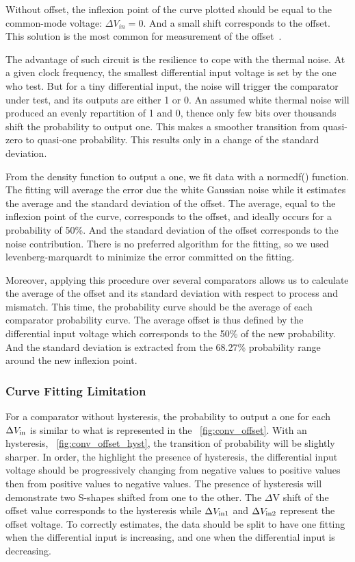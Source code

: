 Without offset, the inflexion point of the curve plotted should be equal to the common-mode voltage: $\Delta V_{in} = 0$. And a small shift corresponds to the offset. This solution is the most common for measurement of the offset~\cite{4395036,6482245,6644886}.

The advantage of such circuit is the resilience to cope with the thermal noise. At a given clock frequency, the smallest differential input voltage is set by the one who test. But for a tiny differential input, the noise will trigger the comparator under test, and its outputs are either 1 or 0. An assumed white thermal noise will produced an evenly repartition of 1 and 0, thence only few bits over thousands shift the probability to output one. This makes a smoother transition from quasi-zero to quasi-one probability. This results only in a change of the standard deviation.

From the density function to output a one, we fit data with a normcdf() function. The fitting will average the error due the white Gaussian noise while it estimates the average and the standard deviation of the offset. The average, equal to the inflexion point of the curve, corresponds to the offset, and ideally occurs for a probability of 50\%. And the standard deviation of the offset corresponds to the noise contribution. There is no preferred algorithm for the fitting, so we used levenberg-marquardt to minimize the error committed on the fitting.

Moreover, applying this procedure over several comparators allows us to calculate the average of the offset and its standard deviation with respect to process and mismatch. This time, the probability curve should be the average of each comparator probability curve. The average offset is thus defined by the differential input voltage which corresponds to the 50\% of the new probability. And the standard deviation is extracted from the 68.27\% probability range around the new inflexion point.

\subsubsection{Curve Fitting Limitation}
For a comparator without hysteresis, the probability to output a one for each $\Delta V_{\rm in}$ is similar to what is represented in the \figurename~\ref{fig:conv_offset}. With an hysteresis, \figurename~\ref{fig:conv_offset_hyst}, the transition of probability will be slightly sharper. In order, the highlight the presence of hysteresis, the differential input voltage should be progressively changing from negative values to positive values then from positive values to negative values. The presence of hysteresis will demonstrate two S-shapes shifted from one to the other. The $\Delta$V shift of the offset value corresponds to the hysteresis while $\Delta V_{\rm in1}$ and $\Delta V_{\rm in2}$ represent the offset voltage. To correctly estimates, the data should be split to have one fitting when the differential input is increasing, and one when the differential input is decreasing.

